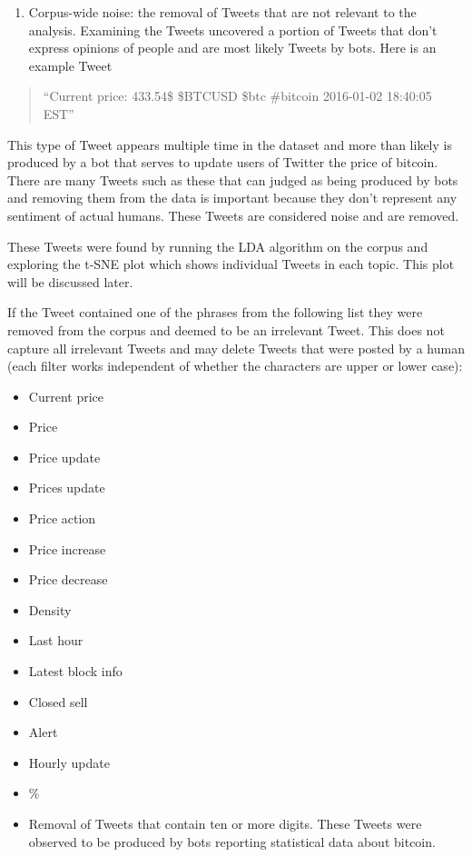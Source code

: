 \documentclass[
]{article}
\providecommand{\tightlist}{%
  \setlength{\itemsep}{0pt}\setlength{\parskip}{0pt}}
\begin{document}
\begin{enumerate}
\def\labelenumi{\arabic{enumi}.}
\tightlist
\item
  Corpus-wide noise: the removal of Tweets that are not relevant to the
  analysis. Examining the Tweets uncovered a portion of Tweets that
  don't express opinions of people and are most likely Tweets by bots.
  Here is an example Tweet
\end{enumerate}

\begin{quote}
``Current price: 433.54\$ \$BTCUSD \$btc \#bitcoin 2016-01-02 18:40:05
EST''
\end{quote}

This type of Tweet appears multiple time in the dataset and more than
likely is produced by a bot that serves to update users of Twitter the
price of bitcoin. There are many Tweets such as these that can judged as
being produced by bots and removing them from the data is important
because they don't represent any sentiment of actual humans. These
Tweets are considered noise and are removed.

These Tweets were found by running the LDA algorithm on the corpus and
exploring the t-SNE plot which shows individual Tweets in each topic.
This plot will be discussed later.

If the Tweet contained one of the phrases from the following list they
were removed from the corpus and deemed to be an irrelevant Tweet. This
does not capture all irrelevant Tweets and may delete Tweets that were
posted by a human (each filter works independent of whether the
characters are upper or lower case):

\begin{itemize}
\tightlist
\item
  Current price
\item
  Price
\item
  Price update
\item
  Prices update
\item
  Price action
\item
  Price increase
\item
  Price decrease
\item
  Density
\item
  Last hour
\item
  Latest block info
\item
  Closed sell
\item
  Alert
\item
  Hourly update
\item
  \%
\item
  Removal of Tweets that contain ten or more digits. These Tweets were
  observed to be produced by bots reporting statistical data about
  bitcoin.
\end{itemize}
\end{document}
